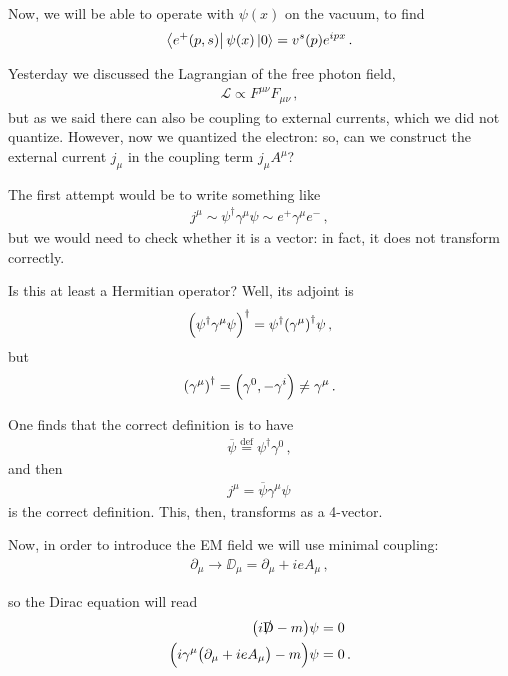 \documentclass[main.tex]{subfiles}
\begin{document}
Now, we will be able to operate with \(\psi (x)\) on the vacuum, to find 
%
\begin{align}
\bra{e^{+}(p, s)} \psi (x) \ket{0} = v^{s} (p) e^{ipx}
\,.
\end{align}

Yesterday we discussed the Lagrangian of the free photon field, 
%
\begin{align}
\mathscr{L} \propto F^{\mu \nu } F_{\mu \nu }
\,,
\end{align}
%
but as we said there can also be coupling to external currents, which we did not quantize. 
However, now we quantized the electron: so, can we construct the external current \(j_{\mu }\) in the coupling term \(j_{\mu }A^{\mu }\)? 

The first attempt would be to write something like 
%
\begin{align}
j^{\mu } \sim \psi ^\dag \gamma^{\mu } \psi 
\sim e^{+} \gamma^{\mu } e^{-}
\,,
\end{align}
%
but we would need to check whether it is a vector: in fact, it does not transform correctly. 

Is this at least a Hermitian operator? Well, its adjoint is 
%
\begin{align}
\qty(\psi ^\dag \gamma^{\mu } \psi ) ^\dag = \psi ^\dag \qty(\gamma^{\mu })^\dag \psi 
\,,
\end{align}
%
but 
%
\begin{align}
\qty(\gamma^{\mu })^\dag = \qty(\gamma^{0}, - \gamma^{i}) \neq \gamma^{\mu }
\,.
\end{align}

One finds that the correct definition is to have 
%
\begin{align}
\overline{\psi} \overset{\text{def}}{=}
\psi ^\dag \gamma^{0}
\,,
\end{align}
%
and then 
%
\begin{align}
j^{\mu } = \overline{\psi} \gamma^{\mu } \psi 
\,
\end{align}
%
is the correct definition. This, then, transforms as a 4-vector. 

Now, in order to introduce the EM field we will use minimal coupling: 
%
\begin{align}
\partial_{\mu } \rightarrow \DD_{\mu } = \partial_{\mu } + ie A_{\mu }
\,,
\end{align}
%

so the Dirac equation will read 
%
\begin{align}
\qty( i \slashed{\mathrm{D}} -m ) \psi &= 0  \\
\qty(i \gamma^{\mu } \qty(\partial_{\mu } + ie A_{\mu }) -m ) \psi &= 0 
\,.
\end{align}
\end{document}
